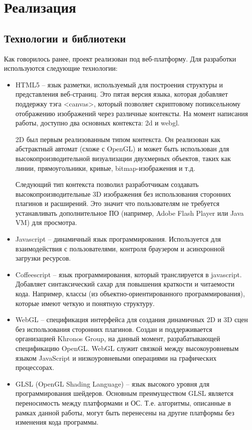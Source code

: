 \newpage
\section{Реализация} 

\subsection{Технологии и библиотеки} 

Как говорилось ранее, проект реализован под веб-платформу. Для разработки используются следующие технологии:

\begin{itemize} 
  \item HTML5 -- язык разметки, используемый для построения структуры и представления веб-страниц. 
    Это пятая версия языка, которая добавляет поддержку тэга \textless{}canvas\textgreater{}, 
    который позволяет скриптовому попиксельному отображению изображений через различные контексты. 
    На момент написания работы, доступно два основных контекста: 2d и webgl.

    2D был первым реализованным типом контекста. Он реализован как абстрактный автомат (схоже 
    с OpenGL) и может быть использован для высокопроизводительной визуализации двухмерных объектов, 
    таких как линии, прямоугольники, кривые, bitmap-изображения и т.д.

    Следующий тип контекста позволил разработчикам создавать высокопроизводительные 3D изображения 
    без использования сторонних плагинов и расширений. Это значит что пользователям не требуется 
    устанавливать дополнительное ПО (например, Adobe Flash Player или Java VM) для просмотра.

  \item Javascript -- динамичный язык программирования. Используется для взаимодействия с 
    пользователями, контроля браузером и асинхронной загрузки ресурсов.

  \item Coffeescript -- язык программирования, который транслируется в javascript. Добавляет 
    синтаксический сахар для повышения краткости и читаемости кода. Например, классы 
    (из объектно-ориентированного программирования), которые имеют четкую и понятную структуру.

  \item WebGL -- спецификация интерфейса для создания динамичных 2D и 3D сцен без использования 
    сторонних плагинов. Создан и поддерживается организацией Khronos Group, на данный момент, 
    разрабатывающей спецификацию OpenGL. WebGL служит связкой между высокоуровневым языком 
    JavaScript и низкоуровневыми операциями на графических процессорах.

  \item GLSL (OpenGL Shading Language) -- язык высокого уровня для программирования шейдеров. 
    Основным преимуществом GLSL является переносимость между платформами и ОС. Т.е. алгоритмы, 
    описанные в рамках данной работы, могут быть перенесены на другие платформы без изменения 
    кода программы.
\end{itemize}

